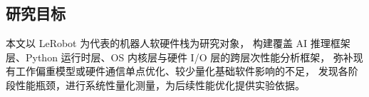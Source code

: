 \subsection{研究目标}

本文以 LeRobot 为代表的机器人软硬件栈为研究对象，
构建覆盖 AI 推理框架层、Python 运行时层、OS 内核层与硬件 I/O 层的跨层次性能分析框架，
弥补现有工作偏重模型或硬件通信单点优化、较少量化基础软件影响的不足，
发现各阶段性能瓶颈，进行系统性量化测量，为后续性能优化提供实验依据。
